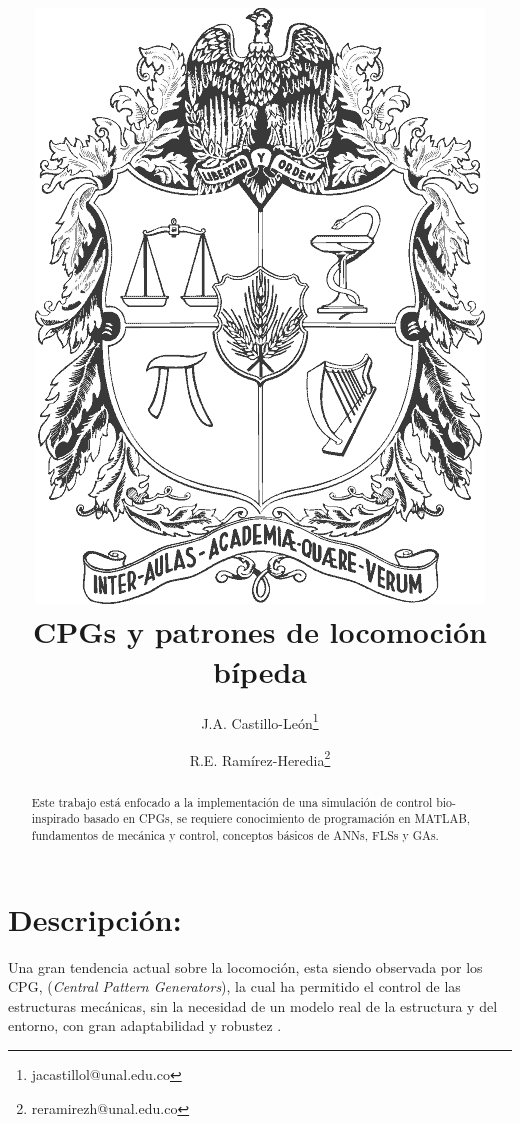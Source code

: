 \documentclass[10pt,onecolumn,twoside,letterpaper]{article}
\title{\vspace{-0.8cm}\includegraphics[scale=0.12]{../../images/unescudobn.png}\\\vspace{-0.0cm}
  \LARGE \textbf{CPGs y patrones de locomoci\'on b\'ipeda}}
\author{J.A. Castillo-Le\'on\thanks{jacastillol@unal.edu.co} \and R.E. Ram\'irez-Heredia\thanks{reramirezh@unal.edu.co}}
\date{}
\begin{document}
\maketitle
\begin{abstract}\small
  Este trabajo est\'a enfocado a la implementaci\'on de una simulaci\'on de control bio-inspirado basado en CPGs, se requiere conocimiento de programaci\'on en MATLAB, fundamentos de mec\'anica y control, conceptos b\'asicos de ANNs, FLSs y GAs. 
\end{abstract}
\section{Descripci\'on:}
Una gran tendencia actual sobre la locomoci\'on, esta siendo observada por los CPG, (\emph{Central Pattern Generators}), la cual ha permitido el control de las estructuras mec\'anicas, sin la necesidad de un modelo real de la estructura y del entorno, con gran adaptabilidad y robustez \cite{Verdaasdonk2009}.
\end{document}
